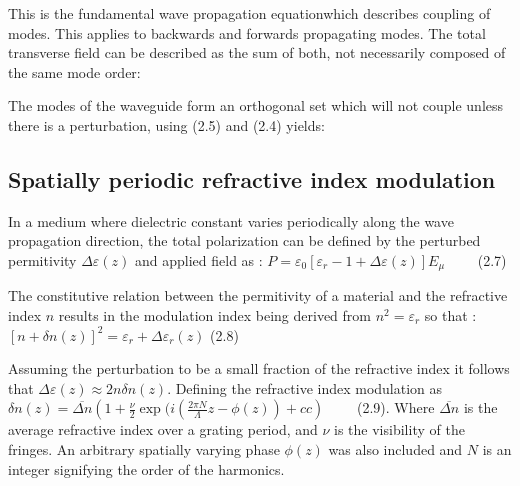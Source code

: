 \documentclass[11pt, openright]{book}
\begin{document}
        This is the fundamental wave propagation equationwhich describes coupling of modes. This applies to backwards and forwards propagating modes. The total transverse field can be described  as the sum of both, not necessarily composed of the same mode order: 

        The modes of the waveguide form an orthogonal set which will not couple unless there is a perturbation, using (2.5) and (2.4) yields: 
        

        \subsection*{Spatially periodic refractive index modulation}

        In a medium where dielectric constant varies periodically along the wave propagation direction, the total polarization can be defined by the perturbed permitivity $\Delta\varepsilon(z)$ and applied field as : $P=\varepsilon_0\left[ \varepsilon_r -1+\Delta\varepsilon(z) \right] E_\mu \qquad$ (2.7)

        The constitutive relation between the permitivity of a material and the refractive index $n$ results in the modulation index being derived from $n^2 = \varepsilon_r$ so that : $\left[ n+ \delta n(z) \right]^2  = \varepsilon_r +\Delta\varepsilon_r(z)$ \hfill (2.8)

        Assuming the perturbation to be a small fraction of the refractive index it follows that $\Delta\varepsilon(z) \approx 2n\delta n(z)$. Defining the refractive index modulation as $\delta n(z)= \overline{\Delta n}\left( 1+ \frac{\nu}{2} \exp (i(\frac{2\pi N}{\Lambda}z -\phi(z))+cc \right)  \qquad$ (2.9). Where $\overline{\Delta n}$ is the average refractive index over a grating period, and $\nu$ is the visibility of the fringes. An arbitrary spatially varying phase $\phi(z)$ was also included and  $N$ is an integer signifying the order of the harmonics.
        
\end{document}
